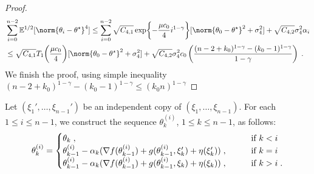 \begin{proof}
\begin{align}
    &\sum_{i=0}^{n-2}\PE^{1/2}[\norm{\theta_{i}-\thetas}^4] \leq \sum_{i=0}^{n-2} \sqrt{C_{4,1}}\exp\biggl\{ -\frac{\mu c_0}{4}i^{1-\gamma}\biggr\}[\norm{\theta_0-\thetas}^2 + \sigma_4^2] + \sqrt{C_{4,2}}\sigma_4^2\alpha_i\\& \leq \sqrt{C_{4,1}}T_1\biggl(\frac{\mu c_0}{4}\biggr)[\norm{\theta_0-\thetas}^2 + \sigma_4^2] + \sqrt{C_{4,2}}\sigma_4^2 c_0\left(\frac{(n-2+k_0)^{1-\gamma}- (k_0-1)^{1-\gamma}}{1-\gamma}\right)\eqsp.
\end{align}
We finish the proof, using simple inequality $(n-2+k_0)^{1-\gamma}- (k_0-1)^{1-\gamma} \leq (k_0n)^{1-\gamma}$
\end{proof}


Let $(\xi_1',\ldots, \xi_{n-1}')$ be an independent copy of $(\xi_1,\ldots, \xi_{n-1})$. For each $1 \leq i \leq n-1$, we construct the sequence $\theta_k^{(i)}$, $1 \leq k \leq n-1$, as follows:
\begin{equation}
\label{eq:independent_replace_construct}
\theta_k^{(i)} = 
    \begin{cases}
     \theta_k\;, \qquad &\text{if }k<i\\
     \theta_{k-1}^{(i)} - \alpha_k(\nabla f(\theta_{k-1}^{(i)}) + g(\theta_{k-1}^{(i)}, \xi_k')+ \eta(\xi_k')) \;,\qquad&\text{if }k=i\\
     \theta_{k-1}^{(i)} - \alpha_k(\nabla f(\theta_{k-1}^{(i)}) + g(\theta_{k-1}^{(i)}, \xi_k)+\eta(\xi_k))\;,\qquad&\text{if }k>i \;.
    \end{cases}
\end{equation}

